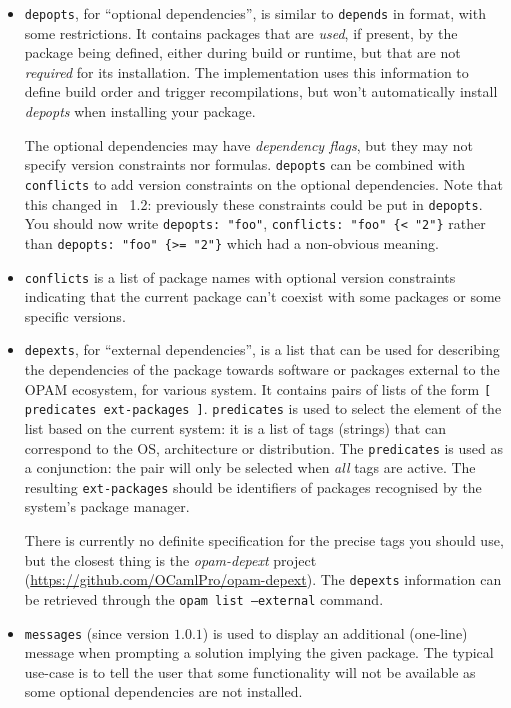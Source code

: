 \documentclass[a4paper,10pt]{article}
\begin{document}
\begin{itemize}
\item {\tt depopts}, for ``optional dependencies'', is similar to {\tt depends}
  in format, with some restrictions. It contains packages that are {\em used},
  if present, by the package being defined, either during build or runtime, but
  that are not {\em required} for its installation. The implementation uses this
  information to define build order and trigger recompilations, but won't
  automatically install {\em depopts} when installing your package.

  The optional dependencies may have {\em dependency flags}, but they may not
  specify version constraints nor formulas. {\tt depopts} can be combined with
  {\tt conflicts} to add version constraints on the optional dependencies. Note
  that this changed in \OPAM\ 1.2: previously these constraints could be put in
  {\tt depopts}. You should now write \verb+depopts: "foo"+,
  \verb+conflicts: "foo" {< "2"}+ rather than \verb+depopts: "foo" {>= "2"}+
  which had a non-obvious meaning.

\item {\tt conflicts} is a list of package names with optional version
  constraints indicating that the current package can't coexist with some
  packages or some specific versions.

\item {\tt depexts}, for ``external dependencies'', is a list that can be used
  for describing the dependencies of the package towards software or packages
  external to the OPAM ecosystem, for various system. It contains pairs of lists
  of the form \verb+[ predicates ext-packages ]+. {\tt predicates} is used to
  select the element of the list based on the current system: it is a list of
  tags (strings) that can correspond to the OS, architecture or distribution.
  The {\tt predicates} is used as a conjunction: the pair will only be selected
  when {\em all} tags are active. The resulting {\tt ext-packages} should be
  identifiers of packages recognised by the system's package manager.

  There is currently no definite specification for the precise tags you should
  use, but the closest thing is the {\em opam-depext} project
  (\url{https://github.com/OCamlPro/opam-depext}). The {\tt depexts} information
  can be retrieved through the {\tt opam list --external} command.

\item {\tt messages} (since version $1.0.1$) is used to
  display an additional (one-line) message when prompting a solution implying
  the given package. The typical use-case is to tell the user that
  some functionality will not be available as some optional
  dependencies are not installed.


\end{itemize}
\end{document}

